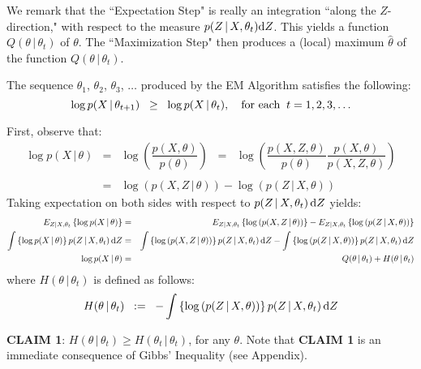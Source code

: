 \begin{remark}\quad
We remark that the ``Expectation Step" is really an integration ``along the $Z$-direction,"
with respect to the measure $p(Z\,|\,X,\theta_{t})\textnormal{d}Z$.
This yields a function $Q(\theta\,|\,\theta_{t})$ of $\theta$.
The ``Maximization Step" then produces a (local) maximum $\widehat{\theta}$ of the function
$Q(\theta\,|\,\theta_{t})$.
\end{remark}
\begin{theorem}\quad
The sequence $\theta_{1}$, $\theta_{2}$, $\theta_{3}$, $\ldots$ produced by the EM Algorithm
satisfies the following:
\begin{equation*}
\log p(X\,|\,\theta_{t+1}) \;\; \geq \;\; \log p(X\,|\,\theta_{t}),
\quad
\textnormal{for each}\;\;t = 1, 2, 3, \ldots
\end{equation*}
\end{theorem}
\proof First, observe that:
\begin{eqnarray*}
\log p(X\,|\,\theta)
& = & \log\left(\dfrac{p(X,\theta)}{p(\theta)}\right)
\;\; = \;\; \log\left(\dfrac{p(X,Z,\theta)}{p(\theta)}\dfrac{p(X,\theta)}{p(X,Z,\theta)}\right) \\
&& \\
& = & \log\left(p(X,Z\,|\,\theta)\right) - \log\left(p(Z\,|\,X,\theta)\right)
\end{eqnarray*}
Taking expectation on both sides with respect to $p(Z\,|\,X,\theta_{t})\,\textnormal{d}Z$ yields:
\begin{eqnarray*}
E_{Z|X,\theta_{t}}\left\{\log p(X\,|\,\theta)\right\}
& = &
E_{Z|X,\theta_{t}}\left\{\log\left(p(X,Z\,|\,\theta)\right)\right\}
-
E_{Z|X,\theta_{t}}\left\{\log\left(p(Z\,|\,X,\theta)\right)\right\}
\\
\int\left\{\log p(X\,|\,\theta)\right\}p(Z\,|\,X,\theta_{t})\,\textnormal{d}Z
& = &
\int\left\{\log\left(p(X,Z\,|\,\theta)\right)\right\}p(Z\,|\,X,\theta_{t})\,\textnormal{d}Z
-
\int\left\{\log\left(p(Z\,|\,X,\theta)\right)\right\}p(Z\,|\,X,\theta_{t})\,\textnormal{d}Z
\\
\log p(X\,|\,\theta)
& = &
Q(\theta\,|\,\theta_{t}) + H(\theta\,|\,\theta_{t})
\end{eqnarray*}
where $H(\theta\,|\,\theta_{t})$ is defined as follows:
\begin{equation*}
H(\theta\,|\,\theta_{t})
\;\; := \;\;
- \int\left\{\log\left(p(Z\,|\,X,\theta)\right)\right\}p(Z\,|\,X,\theta_{t})\,\textnormal{d}Z
\end{equation*}

\vskip 0.5cm
\noindent
\textbf{CLAIM 1}:\;\; $H(\theta\,|\,\theta_{t}) \geq H(\theta_{t}\,|\,\theta_{t})$,\;\; for any $\theta$.
\vskip 0.1cm
\noindent
Note that \textbf{CLAIM 1} is an immediate consequence of Gibbs' Inequality (see Appendix).

